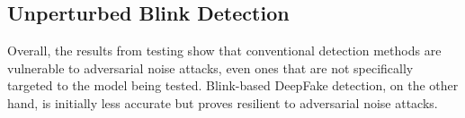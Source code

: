 
\subsection{Unperturbed Blink Detection}

Overall, the results from testing show that conventional detection methods are vulnerable to adversarial noise attacks, even ones that are not specifically targeted to the model being tested. Blink-based DeepFake detection, on the other hand, is initially less accurate but proves resilient to adversarial noise attacks.

